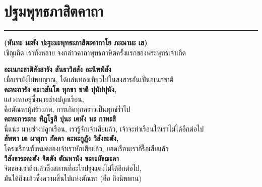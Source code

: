 \documentclass[12pt]{article}
\begin{document}
\pagebreak
\section{ปฐมพุทธภาสิตคาถา}
\hrule
\begin{center}
\textbf{(หันทะ มะยัง ปะฐะมะพุทธะภาสิตะคาถาโย ภะณามะ เส)}\\
เชิญเถิด เราทั้งหลาย จงกล่าวคาถาพุทธภาษิตครั้งแรกของพระพุทธเจ้าเถิด
\end{center}
\textbf{อะเนกะชาติสังสารัง สันธาวิสสัง อะนิพพิสัง}\\
\indent เมื่อเรายังไม่พบญาณ, ได้แล่นท่องเที่ยวไปในสงสารอันเป็นอเนกชาติ\\
\textbf{คะหะการัง คะเวสันโต ทุกขา ชาติ ปุนัปปุนัง,}\\
\indent แสวงหาอยู่ซึ่งนายช่างปลูกเรือน,\\
\indent คือตัณหาผู้สร้างภพ, การเกิดทุกคราวเป็นทุกข์ร่ำไป\\
\textbf{คะหะการะกะ ทิฏโฐสิ ปุนะ เคหัง นะ กาหะสิ}\\
\indent นี่แน่ะ นายช่างปลูกเรือน, เรารู้จักเจ้าเสียแล้ว, เจ้าจะทำเรือนให้เราไม่ได้อีกต่อไป\\
\textbf{สัพพา เต ผาสุกา ภัคคา คะหะกูฏัง วิสังขะตัง,}\\
\indent โครงเรือนทั้งหมดของเจ้าเราหักเสียแล้ว, ยอดเรือนเราก็รื้อเสียแล้ว\\
\textbf{วิสังขาระคะตัง จิตตัง ตัณหานัง ขะยะมัชฌะคา}\\
\indent จิตของเราถึงแล้วซึ่งสภาพที่อะไรปรุงแต่งไม่ได้อีกต่อไป,\\
\indent มันได้ถึงแล้วซึ่งความสิ้นไปแห่งตัณหา (คือ ถึงนิพพาน)\\
\end{document}
